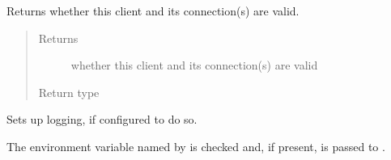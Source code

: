 \documentclass[letterpaper,10pt,english]{sphinxmanual}
\begin{document}
\begin{fulllineitems}
\begin{fulllineitems}
\begin{quote}
\begin{description}
\end{description}\end{quote}

\end{fulllineitems}


\begin{fulllineitems}
\label{\detokenize{autoapi/pine/client/index:pine.client.LocalPineClient.is_valid}}
\sphinxAtStartPar
Returns whether this client and its connection(s) are valid.
\begin{quote}\begin{description}
\item[{Returns}] \leavevmode
\sphinxAtStartPar
whether this client and its connection(s) are valid

\item[{Return type}] \leavevmode
\sphinxAtStartPar
{}

\end{description}\end{quote}

\end{fulllineitems}


\end{fulllineitems}


\begin{fulllineitems}
\label{\detokenize{autoapi/pine/client/index:pine.client.setup_logging}}
\sphinxAtStartPar
Sets up logging, if configured to do so.

\sphinxAtStartPar
The environment variable named by  is checked and, if present, is
passed to .

\end{fulllineitems}
\end{document}
